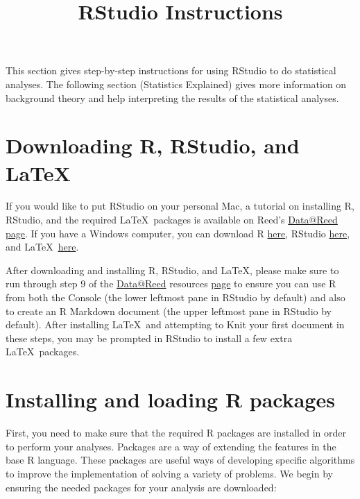 \documentclass[twoside, 12pt]{article}
\title{\textbf{\Large{\sffamily RStudio Instructions}}}
\author{}
\date{}
\begin{document}
\maketitle
\thispagestyle{fancy}

\noindent
This section gives step-by-step instructions for using RStudio to do
statistical analyses. The following section (Statistics Explained) gives
more information on background theory and help interpreting the results
of the statistical analyses.

{
\hypersetup{linkcolor=black}
\setcounter{tocdepth}{1}
\tableofcontents
}


\noindent
\section{Downloading R, RStudio, and
LaTeX}\label{downloading-r-rstudio-and-latex}

If you would like to put RStudio on your personal Mac, a tutorial on
installing R, RStudio, and the required \LaTeX~packages is available on
Reed's \href{data@reed.edu}{Data@Reed}
\href{http://www.reed.edu/data-at-reed/software/R/r_studio.html}{page}.
If you have a Windows computer, you can download R
\href{https://cran.r-project.org/bin/windows/base/}{here}, RStudio
\href{https://www.rstudio.com/products/rstudio/download/}{here}, and
\LaTeX~\href{http://miktex.org/download}{here}.

After downloading and installing R, RStudio, and \LaTeX, please make
sure to run through step 9 of the \href{data@reed.edu}{Data@Reed}
resources
\href{http://www.reed.edu/data-at-reed/software/R/r_studio.html\#TestInstall}{page}
to ensure you can use R from both the Console (the lower leftmost pane
in RStudio by default) and also to create an R Markdown document (the
upper leftmost pane in RStudio by default). After installing \LaTeX~and
attempting to Knit your first document in these steps, you may be
prompted in RStudio to install a few extra \LaTeX~packages.

\section{Installing and loading R
packages}\label{installing-and-loading-r-packages}

First, you need to make sure that the required R packages are installed
in order to perform your analyses. Packages are a way of extending the
features in the base R language. These packages are useful ways of
developing specific algorithms to improve the implementation of solving
a variety of problems. We begin by ensuring the needed packages for your
analysis are downloaded:
\end{document}
